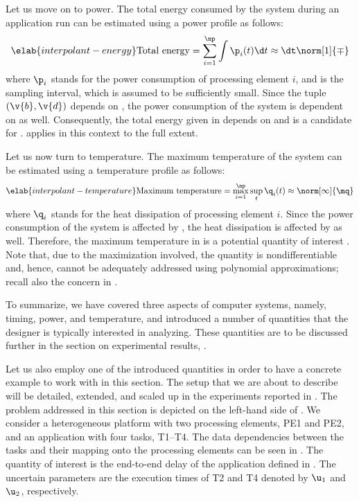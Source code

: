 Let us move on to power. The total energy consumed by the system during an
application run can be estimated using a power profile \mp as follows:
\begin{equation} \elab{interpolant-energy}
  \text{Total energy}
  = \sum_{i = 1}^\np \int \p_i(t) \d t
  \approx \dt \norm[1]{\mp}
\end{equation}
where $\p_i$ stands for the power consumption of processing element $i$, and \dt
is the sampling interval, which is assumed to be sufficiently small. Since the
tuple $(\v{b}, \v{d})$ depends on \vu, the power consumption of the system is
dependent on \vu as well. Consequently, the total energy given in
 depends on \vu and is a candidate for \g.
 applies in this context to the full extent.

Let us now turn to temperature. The maximum temperature of the system can be
estimated using a temperature profile \mq as follows:
\begin{equation} \elab{interpolant-temperature}
  \text{Maximum temperature}
  = \max_{i = 1}^\np \sup_{t} \q_i(t)
  \approx \norm[\infty]{\mq}
\end{equation}
where $\q_i$ stands for the heat dissipation of processing element $i$. Since
the power consumption of the system is affected by \vu, the heat dissipation is
affected by \vu as well. Therefore, the maximum temperature in
 is a potential quantity of interest \g. Note
that, due to the maximization involved, the quantity is nondifferentiable and,
hence, cannot be adequately addressed using polynomial approximations; recall
also the concern in .

To summarize, we have covered three aspects of computer systems, namely, timing,
power, and temperature, and introduced a number of quantities that the designer
is typically interested in analyzing. These quantities are to be discussed
further in the section on experimental results, .

Let us also employ one of the introduced quantities in order to have a concrete
example to work with in this section. The setup that we are about to describe
will be detailed, extended, and scaled up in the experiments reported in
. The problem addressed in this section is depicted on
the left-hand side of . We consider a
heterogeneous platform with two processing elements, PE1 and PE2, and an
application with four tasks, T1--T4. The data dependencies between the tasks and
their mapping onto the processing elements can be seen in
. The quantity of interest \g is the end-to-end
delay of the application defined in . The uncertain
parameters \vu are the execution times of T2 and T4 denoted by $\u_1$ and
$\u_2$, respectively.

